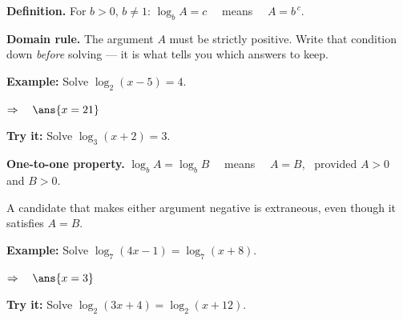 \documentclass[12pt]{article}
\begin{document}


\begin{formulabox}
\textbf{Definition.} For $b > 0$, $b \neq 1$: \quad
$\log_{b} A = c$ \ \ means \ \ $A = b^{\,c}$.\par
\textbf{Domain rule.} The argument $A$ must be strictly positive. Write that condition down \emph{before} solving --- it is what tells you which answers to keep.
\end{formulabox}

\begin{examplebox}
\textbf{Example:} \quad Solve $\log_{2}(x - 5) = 4$.

$\Rightarrow\quad \ans{x = 21}$
\end{examplebox}

\begin{tryitbox}
\textbf{Try it:} \quad Solve $\log_{3}(x + 2) = 3$.\\[2pt]
\end{tryitbox}


\begin{formulabox}
\textbf{One-to-one property.} \quad $\log_{b} A = \log_{b} B$ \ \ means \ \ $A = B$, \ provided $A > 0$ and $B > 0$.\par
A candidate that makes either argument negative is extraneous, even though it satisfies $A = B$.
\end{formulabox}

\begin{examplebox}
\textbf{Example:} \quad Solve $\log_{7}(4x - 1) = \log_{7}(x + 8)$.

$\Rightarrow\quad \ans{x = 3}$
\end{examplebox}

\begin{tryitbox}
\textbf{Try it:} \quad Solve $\log_{2}(3x + 4) = \log_{2}(x + 12)$.\\[2pt]
\end{tryitbox}
\end{document}
